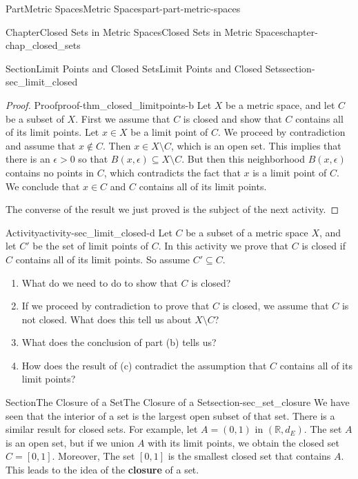 \documentclass[oneside,10pt,]{book}
\newcommand{\terminology}[1]{\textbf{#1}}
\numberwithin{equation}{chapter}
\newcommand{\R}{\mathbb{R}}
\newcommand{\gt}{>}
\begin{document}
\begin{partptx}{Part}{Metric Spaces}{}{Metric Spaces}{}{}{part-part-metric-spaces}
\begin{chapterptx}{Chapter}{Closed Sets in Metric Spaces}{}{Closed Sets in Metric Spaces}{}{}{chapter-chap_closed_sets}
\begin{sectionptx}{Section}{Limit Points and Closed Sets}{}{Limit Points and Closed Sets}{}{}{section-sec_limit_closed}
\begin{proof}{Proof}{}{proof-thm_closed_limitpoints-b}
Let \(X\) be a metric space, and let \(C\) be a subset of \(X\). First we assume that \(C\) is closed and show that \(C\) contains all of its limit points. Let \(x \in X\) be a limit point of \(C\). We proceed by contradiction and assume that \(x \notin C\). Then \(x \in X \setminus C\), which is an open set. This implies that there is an \(\epsilon \gt 0\) so that \(B(x, \epsilon) \subseteq X \setminus C\). But then this neighborhood \(B(x, \epsilon)\) contains no points in \(C\), which contradicts the fact that \(x\) is a limit point of \(C\). We conclude that \(x \in C\) and \(C\) contains all of its limit points.%
\par
The converse of the result we just proved is the subject of the next activity.%
\end{proof}
\begin{activity}{Activity}{}{activity-sec_limit_closed-d}%
Let \(C\) be a subset of a metric space \(X\), and let \(C'\) be the set of limit points of \(C\). In this activity we prove that \(C\) is closed if \(C\) contains all of its limit points. So assume \(C' \subseteq C\).%
\begin{enumerate}[font=\bfseries,label=(\alph*),ref=\alph*]%
\item{}What do we need to do to show that \(C\) is closed?%
\item{}If we proceed by contradiction to prove that \(C\) is closed, we assume that \(C\) is not closed. What does this tell us about \(X \setminus C\)?%
\item{}What does the conclusion of part (b) tells us?%
\item{}How does the result of (c) contradict the assumption that \(C\) contains all of its limit points?%
\end{enumerate}%
\end{activity}%
\end{sectionptx}
%
%
\typeout{************************************************}
\typeout{************************************************}
%
\begin{sectionptx}{Section}{The Closure of a Set}{}{The Closure of a Set}{}{}{section-sec_set_closure}
We have seen that the interior of a set is the largest open subset of that set. There is a similar result for closed sets. For example, let \(A = (0,1)\) in \((\R, d_E)\). The set \(A\) is an open set, but if we union \(A\) with its limit points, we obtain the closed set \(C = [0,1]\). Moreover, The set \([0,1]\) is the smallest closed set that contains \(A\). This leads to the idea of the \terminology{closure} of a set.%

\end{sectionptx}
\end{chapterptx}
\end{partptx}
\end{document}
